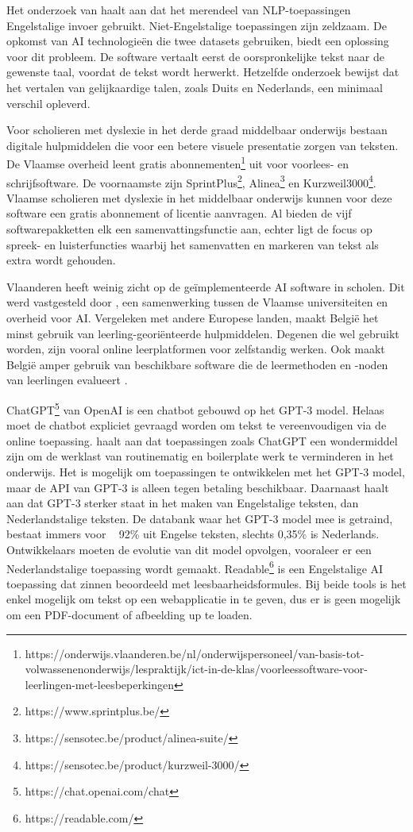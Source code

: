 Het onderzoek van \textcite{Sciforce2020} haalt aan dat het merendeel van NLP-toepassingen Engelstalige invoer gebruikt. Niet-Engelstalige toepassingen zijn zeldzaam. De opkomst van AI technologieën die twee datasets gebruiken, biedt een oplossing voor dit probleem. De software vertaalt eerst de oorspronkelijke tekst naar de gewenste taal, voordat de tekst wordt herwerkt. Hetzelfde onderzoek bewijst dat het vertalen van gelijkaardige talen, zoals Duits en Nederlands, een minimaal verschil opleverd.

Voor scholieren met dyslexie in het derde graad middelbaar onderwijs bestaan digitale hulpmiddelen die voor een betere visuele presentatie zorgen van teksten. De Vlaamse overheid leent gratis abonnementen\footnote{https://onderwijs.vlaanderen.be/nl/onderwijspersoneel/van-basis-tot-volwassenenonderwijs/lespraktijk/ict-in-de-klas/voorleessoftware-voor-leerlingen-met-leesbeperkingen} uit voor voorlees- en schrijfsoftware. De voornaamste zijn SprintPlus\footnote{https://www.sprintplus.be/}, Alinea\footnote{https://sensotec.be/product/alinea-suite/} en Kurzweil3000\footnote{https://sensotec.be/product/kurzweil-3000/}. Vlaamse scholieren met dyslexie in het middelbaar onderwijs kunnen voor deze software een gratis abonnement of licentie aanvragen. Al bieden de vijf softwarepakketten elk een samenvattingsfunctie aan, echter ligt de focus op spreek- en luisterfuncties waarbij het samenvatten en markeren van tekst als extra wordt gehouden.

Vlaanderen heeft weinig zicht op de geïmplementeerde AI software in scholen. Dit werd vastgesteld door \autocite{Martens2021}, een samenwerking tussen de Vlaamse universiteiten en overheid voor AI. Vergeleken met andere Europese landen, maakt België het minst gebruik van leerling-georiënteerde hulpmiddelen. Degenen die wel gebruikt worden, zijn vooral online leerplatformen voor zelfstandig werken. Ook maakt België amper gebruik van beschikbare software die de leermethoden en -noden van leerlingen evalueert \autocite{Martens2021a}. 

ChatGPT\footnote{https://chat.openai.com/chat} van OpenAI is een chatbot gebouwd op het GPT-3 model. Helaas moet de chatbot expliciet gevraagd worden om tekst te vereenvoudigen via de online toepassing. \textcite{Verhoeven2023} haalt aan dat toepassingen zoals ChatGPT een wondermiddel zijn om de werklast van routinematig en boilerplate werk te verminderen in het onderwijs. Het is mogelijk om toepassingen te ontwikkelen met het GPT-3 model, maar de API van GPT-3 is alleen tegen betaling beschikbaar. Daarnaast haalt \textcite{Deckmyn2021} aan dat GPT-3 sterker staat in het maken van Engelstalige teksten, dan Nederlandstalige teksten. De databank waar het GPT-3 model mee is getraind, bestaat immers voor ~ 92\% uit Engelse teksten, slechts 0,35\% is Nederlands. Ontwikkelaars moeten de evolutie van dit model opvolgen, vooraleer er een Nederlandstalige toepassing wordt gemaakt. Readable\footnote{https://readable.com/} is een Engelstalige AI toepassing dat zinnen beoordeeld met leesbaarheidsformules. Bij beide tools is het enkel mogelijk om tekst op een webapplicatie in te geven, dus er is geen mogelijk om een PDF-document of afbeelding up te loaden.

